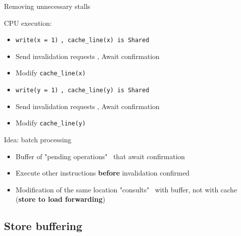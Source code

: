 \begin{frame}{Removing unnecessary stalls}

CPU execution:
\begin{itemize}
    \item \texttt{write(x = 1)} \pause \texttt{, cache\_line(x) is Shared}
    \pause
    \item Send invalidation requests \pause , Await confirmation
    \pause
    \item Modify \texttt{cache\_line(x)}

    \pause
    \item \texttt{write(y = 1)} \pause \texttt{, cache\_line(y) is Shared}
    \pause
    \item Send invalidation requests \pause ,  Await confirmation
    \pause
    \item Modify \texttt{cache\_line(y)}
\end{itemize}

\pause


\pause

Idea: batch processing
\begin{itemize}
    \item Buffer of "pending operations" \ that await confirmation
    \item Execute other instructions \textbf{before} invalidation confirmed
    \item Modification of the same location "consults" \ with buffer, not with cache (\textbf{store to load forwarding})
\end{itemize}

\end{frame}

\subsection{Store buffering}
\showTOCSub

